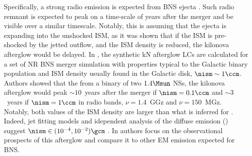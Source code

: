 Specifically, a strong radio emission is expected from \ac{BNS} ejecta \citep{Piran:2012wd,Hotokezaka:2015eja}. Such radio remnant is expected to peak on a time-scale 
of years after the merger and be visible over a similar timescale. Notably, this is assuming that the 
ejecta is expanding into the unshocked \ac{ISM}, as it was shown that if the \ac{ISM} is 
pre-shocked by the jetted outflow, and the \ac{ISM} density is reduced, the kilonova afterglow would 
be delayed. 
In \citet{Piran:2012wd}, the synthetic \ac{kN} afterglow \acp{LC} are calculated for a set of \ac{NR} \ac{BNS} merger simulation with properties typical to the Galactic binary population and \ac{ISM} density usually found in the Galactic disk, $\nism\sim1\ccm$. Authors showed that the from a binary of two $1.4\Msun$ \acp{NS}, the kilonova afterglow would peak $\sim10$~years after the merger if $\nism = 0.1\ccm$ and $\sim3$~years if $\nism = 1\ccm$ in radio bands, $\nu=1.4$~GGz and $\nu=150$~MGz. Notably, both values of the \ac{ISM} density are larger than what is inferred for \GW{}. Indeed, jet fitting models and idependent analysis of the diffuse emission () suggest $\nism\in(10^{-4},10^{-2})\gcm$ \citep{Hajela:2019mjy}.
In \citet{Piran:2012wd} authors focus on the observational prospects of this afterglow and compare it to other \ac{EM} emission expected for \ac{BNS}. 




\cite{Lee:2007js,Nakar:2007yr,Gehrels:2009,Fernandez:2015use}

